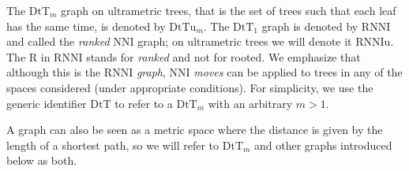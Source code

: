 \documentclass[11pt]{amsart}
\theoremstyle{definition}
\newcommand{\nni}{\mathrm{NNI}}
\newcommand{\rnni}{\mathrm{RNNI}}
\newcommand{\rnniu}{\mathrm{RNNIu}}
\newcommand{\dtt}{\mathrm{DtT}}
\newcommand{\dttu}{\mathrm{DtTu}}
\begin{document}
The $\dtt_m$ graph on ultrametric trees, that is the set of trees such that each leaf has the same time, is denoted by $\dttu_m$.
The $\dtt_1$ graph is denoted by $\rnni$ and called the \emph{ranked $\nni$} graph; on ultrametric trees we will denote it $\rnniu$.
The $\mathrm R$ in $\rnni$ stands for \emph{ranked} and not for rooted.
We emphasize that although this is the $\rnni$ \emph{graph}, $\nni$ \emph{moves} can be applied to trees in any of the spaces considered (under appropriate conditions).
For simplicity, we use the generic identifier $\dtt$ to refer to a $\dtt_m$ with an arbitrary $m > 1$.

A graph can also be seen as a metric space where the distance is given by the length of a shortest path, so we will refer to $\dtt_m$ and other graphs introduced below as both.
\end{document}
